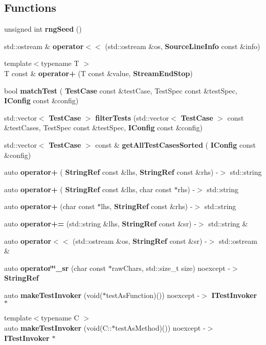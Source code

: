 \subsection*{Functions}
\begin{DoxyCompactItemize}
\item 
unsigned int \textbf{ rng\+Seed} ()
\item 
std\+::ostream \& \textbf{ operator$<$$<$} (std\+::ostream \&os, \textbf{ Source\+Line\+Info} const \&info)
\item 
{\footnotesize template$<$typename T $>$ }\\T const  \& \textbf{ operator+} (T const \&value, \textbf{ Stream\+End\+Stop})
\item 
bool \textbf{ match\+Test} (\textbf{ Test\+Case} const \&test\+Case, Test\+Spec const \&test\+Spec, \textbf{ I\+Config} const \&config)
\item 
std\+::vector$<$ \textbf{ Test\+Case} $>$ \textbf{ filter\+Tests} (std\+::vector$<$ \textbf{ Test\+Case} $>$ const \&test\+Cases, Test\+Spec const \&test\+Spec, \textbf{ I\+Config} const \&config)
\item 
std\+::vector$<$ \textbf{ Test\+Case} $>$ const  \& \textbf{ get\+All\+Test\+Cases\+Sorted} (\textbf{ I\+Config} const \&config)
\item 
auto \textbf{ operator+} (\textbf{ String\+Ref} const \&lhs, \textbf{ String\+Ref} const \&rhs) -\/$>$ std\+::string
\item 
auto \textbf{ operator+} (\textbf{ String\+Ref} const \&lhs, char const $\ast$rhs) -\/$>$ std\+::string
\item 
auto \textbf{ operator+} (char const $\ast$lhs, \textbf{ String\+Ref} const \&rhs) -\/$>$ std\+::string
\item 
auto \textbf{ operator+=} (std\+::string \&lhs, \textbf{ String\+Ref} const \&sr) -\/$>$ std\+::string \&
\item 
auto \textbf{ operator$<$$<$} (std\+::ostream \&os, \textbf{ String\+Ref} const \&sr) -\/$>$ std\+::ostream \&
\item 
auto \textbf{ operator\char`\"{}\char`\"{}\+\_\+sr} (char const $\ast$raw\+Chars, std\+::size\+\_\+t size) noexcept -\/$>$ \textbf{ String\+Ref}
\item 
auto \textbf{ make\+Test\+Invoker} (void($\ast$test\+As\+Function)()) noexcept -\/$>$ \textbf{ I\+Test\+Invoker} $\ast$
\item 
{\footnotesize template$<$typename C $>$ }\\auto \textbf{ make\+Test\+Invoker} (void(C\+::$\ast$test\+As\+Method)()) noexcept -\/$>$ \textbf{ I\+Test\+Invoker} $\ast$

\end{DoxyCompactItemize}
